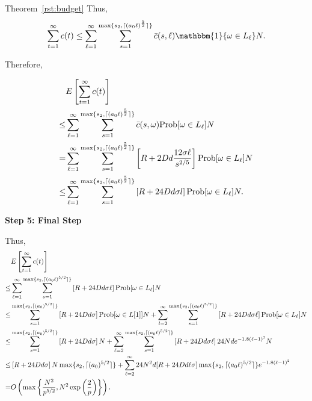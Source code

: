\begin{extraproof}{Theorem~\ref{rst:budget}}
Thus,
\begin{align*}
\sum_{t=1}^{\infty}c(t)\leq\sum_{\ell=1}^{\infty}\sum_{s=1}^{\max\{s_2,\lceil (a_0 \ell)^\frac{5}{2} \rceil\}}\bar{c}(s,\ell)\mathbbm{1}\{\SP\in \Env{\ell}\}N. 
\end{align*}

Therefore,

\begin{align*}
&E\left[\sum_{t=1}^{\infty}c(t)\right] \\
\leq &\sum_{\ell=1}^{\infty}\sum_{s=1}^{\max\{s_2,\lceil (a_0 \ell)^\frac{5}{2} \rceil\}}\bar{c}(s,\SP)\Prob{\SP \in \Env{\ell}}N  \\
=&\sum_{\ell=1}^{\infty}\sum_{s=1}^{\max\{s_2,\lceil (a_0 \ell)^\frac{5}{2} \rceil\}}\left[\MAXR+2\Diam d\frac{12\sigma \ell}{s^{2/5}}\right]\Prob{\SP\in \Env{\ell}}N  \\
\leq &\sum_{\ell=1}^{\infty}\sum_{s=1}^{\max\{s_2,\lceil (a_0 \ell)^\frac{5}{2} \rceil\}}\left[\MAXR+24\Diam d\sigma l\right]\Prob{\SP\in \Env{\ell}}N. 
\end{align*}

\noindent\textbf{Step 5: Final Step}

Thus,
\begin{align*}
&E\left[\sum_{t=1}^{\infty}c(t)\right]  \\
\leq&\sum_{\ell=1}^{\infty}\sum_{s=1}^{\max\{s_2,\lceil (a_0 \ell)^{5/2} \rceil\}}\left[\MAXR+24\Diam d\sigma \ell\right]\Prob{\SP\in \Env{\ell}}N  \\
\leq& \sum_{s=1}^{\max\{s_2,\lceil (a_0)^{5/2} \rceil\}}\left[\MAXR+24\Diam d\sigma \right]\Prob{\SP\in L[1]}N +\sum_{l=2}^{\infty}\sum_{s=1}^{\max\{s_2,\lceil (a_0 \ell)^{5/2} \rceil\}}\left[\MAXR+24\Diam d\sigma \ell\right]\Prob{\SP\in \Env{\ell}}N  \\
\leq& \sum_{s=1}^{\max\{s_2,\lceil (a_0)^{5/2} \rceil\}}\left[R+24\Diam d\sigma \right]N +\sum_{\ell=2}^{\infty}\sum_{s=1}^{\max\{s_2,\lceil (a_0 \ell)^{5/2} \rceil\}}\left[\MAXR+24\Diam d\sigma \ell\right]24\ARMNUM d e^{-1.8(\ell-1)^2}N \\
\leq & \left[\MAXR+24\Diam d\sigma \right]\ARMNUM \max\{s_2,\lceil (a_0)^{5/2} \rceil\}+\sum_{\ell=2}^{\infty}24\ARMNUM^2 d[\MAXR+24\Diam d\ell\sigma]\max\{s_2,\lceil (a_0 \ell)^{5/2} \rceil\} e^{-1.8(\ell-1)^2}  \\
=& O\left(\max\left\{\frac{\ARMNUM^2}{\MinProb^{5/2}},\ARMNUM^2\exp\left(\frac{2}{\MinProb}\right)\right\}\right). 
\end{align*}

\end{extraproof}
